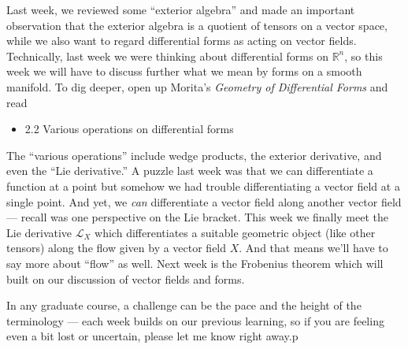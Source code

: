 \documentclass{homework}
\author{Jim Fowler}
\date{Week 5: Forms on manifolds}
\begin{document}
\maketitle

Last week, we reviewed some ``exterior algebra'' and made an important
observation that the exterior algebra is a quotient of tensors on a
vector space, while we also want to regard differential forms as
acting on vector fields.  Technically, last week we were thinking
about differential forms on $\mathbb{R}^n$, so this week we will have
to discuss further what we mean by forms on a smooth manifold.  To dig
deeper, open up Morita's \textit{Geometry of Differential Forms} and
read
\begin{itemize}
\item 2.2 Various operations on differential forms
\end{itemize} The ``various operations'' include wedge products, the
exterior derivative, and even the ``Lie derivative.''  A puzzle last
week was that we can differentiate a function at a point but somehow
we had trouble differentiating a vector field at a single point.  And
yet, we \textit{can} differentiate a vector field along another vector
field --- recall was one perspective on the Lie bracket.  This week we
finally meet the Lie derivative $\mathcal{L}_X$ which differentiates a
suitable geometric object (like other tensors) along the flow given by
a vector field $X$.  And that means we'll have to say more about
``flow'' as well.  Next week is the Frobenius theorem which will built
on our discussion of vector fields and forms.

In any graduate course, a challenge can be the pace and the height of
the terminology --- each week builds on our previous learning, so if
you are feeling even a bit lost or uncertain, please let me know right
away.p
\end{document}
